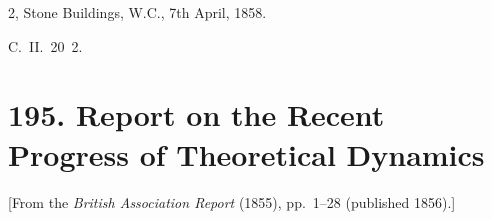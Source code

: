 \documentclass[11pt,a4paper]{book}
\begin{document}
\hfill 2, Stone Buildings, W.C., 7th April, 1858.

\hfill C.~II.~20~2.

\newpage


\section*{195. Report on the Recent Progress of Theoretical Dynamics}

\begin{center}
[From the \textit{British Association Report} (1855), pp.~1--28 (published 1856).]
\end{center}

\bigskip


\end{document}
